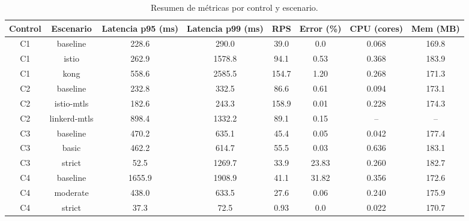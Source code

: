 \begin{table}[H]
\centering
\begin{tabular}{|c|c|c|c|c|c|c|c|}
\hline
Control & Escenario & Latencia p95 (ms) & Latencia p99 (ms) & RPS & Error (\%) & CPU (cores) & Mem (MB) \\
\hline
C1 & baseline & 228.6 & 290.0 & 39.0 & 0.0 & 0.068 & 169.8 \\
C1 & istio    & 262.9 & 1578.8 & 94.1 & 0.53 & 0.368 & 183.9 \\
C1 & kong     & 558.6 & 2585.5 & 154.7 & 1.20 & 0.268 & 171.3 \\
\hline
C2 & baseline & 232.8 & 332.5 & 86.6 & 0.61 & 0.094 & 173.1 \\
C2 & istio-mtls & 182.6 & 243.3 & 158.9 & 0.01 & 0.228 & 174.3 \\
C2 & linkerd-mtls & 898.4 & 1332.2 & 89.1 & 0.15 & -- & -- \\
\hline
C3 & baseline & 470.2 & 635.1 & 45.4 & 0.05 & 0.042 & 177.4 \\
C3 & basic    & 462.2 & 614.7 & 55.5 & 0.03 & 0.636 & 183.1 \\
C3 & strict   & 52.5  & 1269.7 & 33.9 & 23.83 & 0.260 & 182.7 \\
\hline
C4 & baseline & 1655.9 & 1908.9 & 41.1 & 31.82 & 0.356 & 172.6 \\
C4 & moderate & 438.0 & 633.5 & 27.6 & 0.06 & 0.240 & 175.9 \\
C4 & strict   & 37.3  & 72.5  & 0.93 & 0.0 & 0.022 & 170.7 \\
\hline
\end{tabular}
\caption{Resumen de métricas por control y escenario.}
\end{table}
